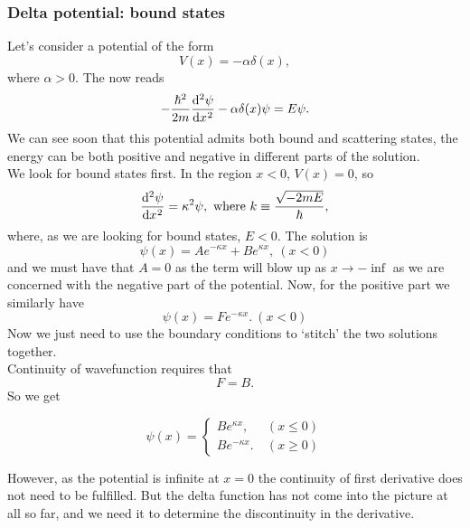 \subsubsection{Delta potential: bound states}
Let's consider a potential of the form
\begin{equation}
V(x)=-\alpha\delta(x),
\end{equation}
where $\alpha>0$. The \sch now reads
\begin{equation}
-\frac{\hbar^2}{2m}\diff[2]{\psi}{x}-\alpha\delta(x)\psi=E\psi.
\end{equation}
We can see soon that this potential admits both bound and scattering states, 
\ie the energy can be both positive and negative in different parts of the solution. \\
We look for bound states first. In the region $x<0$, $V(x)=0$, so
\begin{equation}
\diff[2]{\psi}{x}=\kappa^2\psi,\ \text{where }k\equiv\frac{\sqrt{-2mE}}{\hbar}, 
\end{equation}
where, as we are looking for bound states, $E<0$. The solution is 
\begin{equation}
\psi(x)=Ae^{-\kappa x}+Be^{\kappa x},\ (x<0)
\end{equation}
and we must have that $A=0$ as the term will blow up as $x\rightarrow-\inf$ as we 
are concerned with the negative part of the potential. Now, for the positive part we similarly have
\begin{equation}
\psi(x)=Fe^{-\kappa x}.\ (x<0)
\end{equation}
Now we just need to use the boundary conditions to `stitch' the two solutions 
together. \\
Continuity of wavefunction requires that
\begin{equation}
F=B.
\end{equation}
So we get
\begin{singlespace}
\begin{equation}
\psi(x)=
\begin{cases}
	Be^{\kappa x},\ &(x\leq0)\\
	Be^{-\kappa x}.\ &(x\geq0)
\end{cases}
\end{equation}
\end{singlespace}
However, as the potential is infinite at $x=0$ the continuity of first derivative 
does not need to be fulfilled. 
But the delta function has not come into the picture at all so far, 
and we need it to determine the discontinuity in the derivative. 
